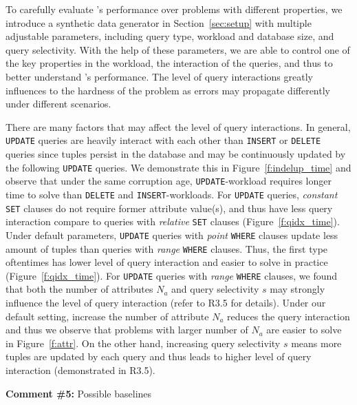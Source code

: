 To carefully evaluate \sys's performance over problems with different
properties, we introduce a synthetic data generator in Section~\ref{sec:setup}
with multiple adjustable parameters, including query type, workload and
database size, and query selectivity. With the help of these parameters, we
are able to control one of the key properties in the workload, the interaction
of the queries, and thus to better understand \sys's performance. The level of
query interactions greatly influences to the hardness of the problem as errors
may propagate differently under different scenarios.

There are many factors that may affect the level of query interactions. In
general, \texttt{UPDATE} queries are heavily interact with each other than
\texttt{INSERT} or \texttt{DELETE} queries since tuples persist in the
database and may be continuously updated by the following \texttt{UPDATE}
queries. We demonstrate this in Figure~\ref{f:indelup_time} and observe that
under the same corruption age, \texttt{UPDATE}-workload requires longer time
to solve than \texttt{DELETE} and \texttt{INSERT}-workloads. For
\texttt{UPDATE} queries, \textit{constant} \texttt{SET} clauses do not require
former attribute value(s), and thus have less query interaction compare to
queries with \textit{relative} \texttt{SET} clauses
(Figure~\ref{f:qidx_time}). Under default parameters, \texttt{UPDATE} queries
with \textit{point} \texttt{WHERE} clauses update less amount of tuples than
queries with \textit{range} \texttt{WHERE} clauses. Thus, the first type
oftentimes has lower level of query interaction and easier to solve in
practice (Figure~\ref{f:qidx_time}). For \texttt{UPDATE} queries with
\textit{range} \texttt{WHERE} clauses, we found that both the number of
attributes $N_a$ and query selectivity $s$ may strongly influence the level of
query interaction (refer to R3.5 for details). Under our default setting,
increase the number of attribute $N_a$ reduces the query interaction and thus
we observe that problems with larger number of $N_a$ are easier to solve in
Figure~\ref{f:attr}. On the other hand, increasing query selectivity $s$ means
more tuples are updated by each query and thus leads to higher level of query
interaction (demonstrated in R3.5).


\comskip

\noindent
\textbf{Comment \#5:} Possible baselines
\begin{quote}
\end{quote}


